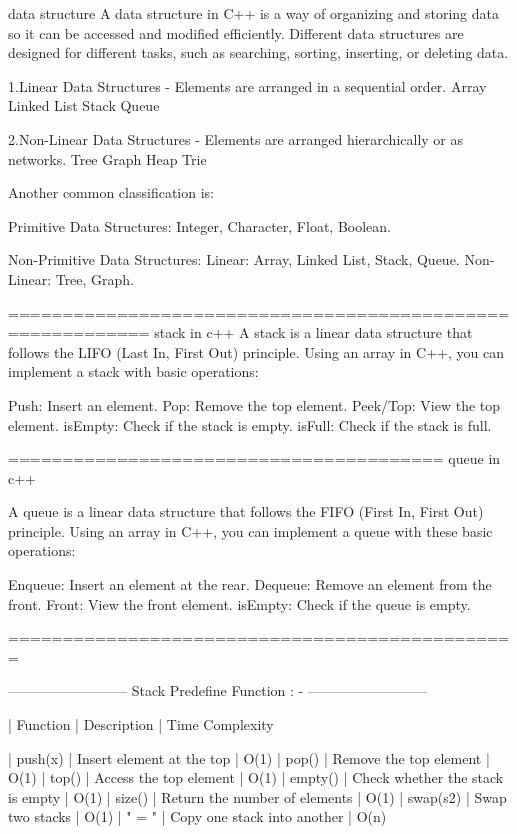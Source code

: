 data structure
A data structure in C++ is a way of organizing and storing data so it can be accessed and modified efficiently. Different data structures are designed for different tasks, such as searching, sorting, inserting, or deleting data.

1.Linear Data Structures -
Elements are arranged in a sequential order.
Array
Linked List
Stack
Queue

2.Non-Linear Data Structures -
Elements are arranged hierarchically or as networks.
Tree
Graph
Heap
Trie



Another common classification is:

Primitive Data Structures: Integer, Character, Float, Boolean.

Non-Primitive Data Structures:
Linear: Array, Linked List, Stack, Queue.
Non-Linear: Tree, Graph.

===========================================================
stack in c++
A stack is a linear data structure that follows the LIFO (Last In, First Out) principle. Using an array in C++, you can implement a stack with basic operations:

Push: Insert an element.
Pop: Remove the top element.
Peek/Top: View the top element.
isEmpty: Check if the stack is empty.
isFull: Check if the stack is full.

========================================
queue in c++

A queue is a linear data structure that follows the FIFO (First In, First Out) principle. Using an array in C++, you can implement a queue with these basic operations:

Enqueue: Insert an element at the rear.
Dequeue: Remove an element from the front.
Front: View the front element.
isEmpty: Check if the queue is empty.

===============================================

--------------------------
Stack Predefine Function       : -
--------------------------

 |       Function	           |            Description                                  |               	Time Complexity

 |      push(x)	               |            Insert element at the top	                  |                       O(1)
 |      pop()	               |            Remove the top element	                      |                       O(1)
 |      top()	               |            Access the top element	                      |                       O(1)
 |      empty()	               |            Check whether the stack is empty	          |                       O(1)
 |      size()	               |            Return the number of elements	              |                       O(1)
 |      swap(s2)	           |            Swap two stacks	                              |                       O(1)
 |      " = "	               |            Copy one stack into another	                  |                       O(n)

